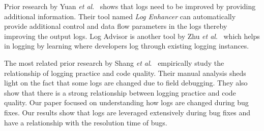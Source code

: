 Prior research by Yuan\textsl{ et al$.$}~\cite{Yuan} shows that logs need to be improved by providing additional information. Their tool named \emph{Log Enhancer} can automatically provide additional control and data flow parameters in the logs thereby improving the output logs. Log Advisor is another tool by Zhu \emph{et al$.$}~\cite{zhu2015learning} which helps in logging by learning where developers log through existing logging instances. 

The most related prior research by Shang \emph{et al$.$}~\cite{EMSEIAN} empirically study the relationship of logging practice and code quality. Their manual analysis sheds light on the fact that some logs are changed due to field debugging. They also show that there is a strong relationship between logging practice and code quality. Our paper focused on understanding how logs are changed during bug fixes. Our results show that logs are leveraged extensively during bug fixes and have a relationship with the resolution time of bugs. 

